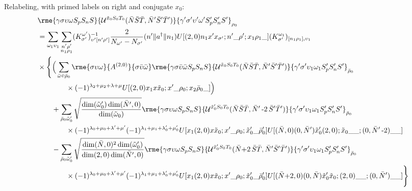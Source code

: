 \documentclass[%
  aps,%
  prc,%
  showpacs,%
  superscriptaddress,%
  onecolumn,%
  notitlepage,%
  11pt,%
  floatfix,%
  amsmath,%
  amssymb,%
]{revtex4-2}
\newcommand{\negative}{\,\text{-}}
\newcommand{\plus}{\text{+}}
\begin{document}
Relabeling, with primed labels on right and conjugate $x_0$:
\begin{align*}
  &\rme{\gamma \sigma \upsilon \omega S_p S_n S}{\mathcal{U}^{\tilde{x}_0 S_0 T_0}(\bar{N} \bar{S} \bar{T},\bar{N}'\bar{S}'\bar{T}')}{\gamma'\sigma'\upsilon'\omega' S_p' S_n' S'}_{\rho_0}\\
  &=\sum_{\omega_1\upsilon_1} \sum_{\substack{n'\rho'\\n_1\rho_1}}(K_{\sigma'}^{\omega'})_{\upsilon'[n'\rho']}^{-1}\frac{2}{N_{\omega'} - N_{\sigma'}}(n'\Vert{}a^\dagger\Vert{}n_1) U[(2,0)n_1 x' x_{\sigma'};n'\_\rho';x_1\rho_1\_](K_{\sigma'}^{\omega_1})_{[n_1\rho_1],\upsilon_1}\\
  &\times\Bigg\{\Big(\sum_{\bar{\omega}\bar{\upsilon}\bar{\rho}_0}
      \rme{\sigma \upsilon \omega}{A^{(2,0)}}{\sigma \bar{\upsilon}\bar{\omega}}
      \rme{\gamma \sigma \bar{\upsilon}\bar{\omega} S_p S_n S}{\mathcal{U}^{\tilde{x}_0S_0T_0}(\bar{N}\bar{S}\bar{T},\bar{N}'\bar{S}'\bar{T}')}{\gamma'\sigma'\upsilon_1\omega_1 S_p' S_n' S'}_{\bar{\rho}_0}\\
  &\qquad\qquad\times
      (-1)^{\lambda_2+\mu_2+\lambda+\mu} U[(2,0) x_1 x \tilde{x}_0; x' \_ \rho_0; x_2\bar{\rho}_0\_]
    \Big)\\
  &\qquad+\sum_{\bar{\rho}_0\tilde{\omega}_0'}
  \sqrt{\frac{\dim(\tilde{\omega}_0')\dim(\bar{N}',0)}{\dim(\tilde{\omega}_0)}} \rme{\gamma \sigma \upsilon \omega S_p S_n S}{\mathcal{U}^{\tilde{x}_0'S_0T_0}(\bar{N}\bar{S}\bar{T},\bar{N}'\negative2\,\bar{S}'\bar{T}')}{\gamma'\sigma'\upsilon_1\omega_1 S_p' S_n' S'}_{\bar{\rho}_0}\\
  &\qquad\qquad\times
      (-1)^{\lambda_0+\mu_0+\lambda'+\mu'}(-1)^{\lambda_1+\mu_1+\lambda_0'+\mu_0'} U[x_1 (2,0) x \tilde{x}_0; x'\_\rho_0;\tilde{x}_0'\_\bar{\rho}_0']
      U[(\bar{N},0) (0,\bar{N}') \tilde{x}_0' (2,0);\tilde{x}_0\_\_;(0,\bar{N}'\negative2)\_\_]\\
  &\qquad-\sum_{\bar{\rho}_0\tilde{\omega}_0'}\sqrt{\frac{\dim(\bar{N},0)^2\dim(\tilde{\omega}_0')}{\dim(2,0)\dim(\bar{N}',0)}} \rme{\gamma \sigma \upsilon \omega S_p S_n S}{\mathcal{U}^{\tilde{x}_0' S_0 T_0}(\bar{N}\plus2\,\bar{S}\bar{T},\bar{N}'\bar{S}'\bar{T}')}{\gamma'\sigma'\upsilon_1\omega_1S_p'S_n'S'}_{\bar{\rho}_0}\\
  &\qquad\qquad\times
    (-1)^{\lambda_0+\mu_0+\lambda'+\mu'}(-1)^{\lambda_1+\mu_1+\lambda_0'+\mu_0'} U[x_1 (2,0) x \tilde{x}_0; x'\_\rho_0;\tilde{x}_0'\_\bar{\rho}_0']
    U[(\bar{N}\plus2,0)(0,\bar{N}) \tilde{x}_0' \tilde{x}_0;(2,0)\_\_;(0,\bar{N}')\_\_]
  \Bigg\}
\end{align*}
\end{document}
